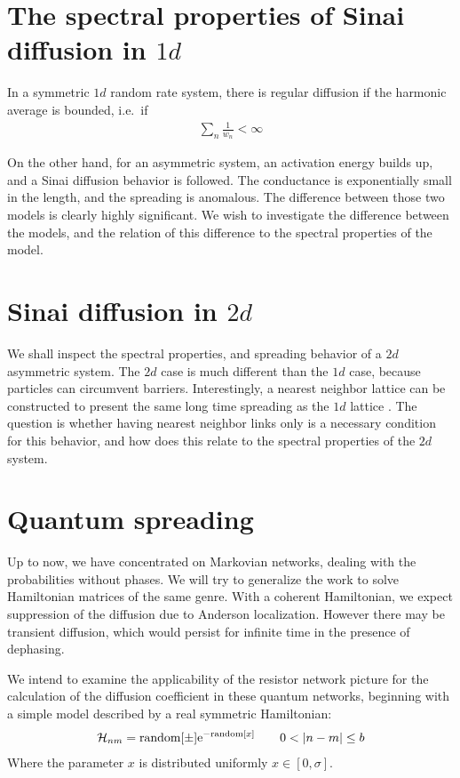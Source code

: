 \section{The spectral properties of Sinai diffusion in $1d$}

In a symmetric $1d$ random rate system, there is regular diffusion 
if the harmonic average is bounded, i.e.\ if
%
\begin{align}
 \sum_n \frac{1}{w_n} < \infty 
\end{align}
%

On the other hand, for an asymmetric system, an activation energy 
builds up, and a Sinai diffusion behavior is followed.
The conductance is exponentially small in the length, and the spreading 
is anomalous. The difference between those two models is clearly highly 
significant. We wish to investigate the difference between the models,
and the relation of this difference to the spectral properties of the model.

\section{Sinai diffusion in $2d$}

We shall inspect the spectral properties, and spreading behavior of a
$2d$ asymmetric system. The $2d$ case is much different than the $1d$ 
case, because particles can circumvent barriers. Interestingly,
a nearest neighbor lattice can be constructed to present the same 
long time spreading as the $1d$ lattice \cite{blumberg_selinger_diffusion_1989}.
The question is whether having nearest neighbor links only 
is a necessary condition for this behavior,
and how does this relate to the spectral properties of the $2d$ system.



\section{Quantum spreading}

Up to now, we have concentrated on Markovian networks, dealing with the probabilities without phases.
We will try to generalize the work to solve Hamiltonian matrices of the same genre.
With a coherent Hamiltonian, 
we expect suppression of the diffusion due to Anderson localization.
However there may be transient diffusion, which would persist 
for infinite time in the presence of dephasing.

We intend to examine the applicability of the resistor network picture for 
the calculation of the diffusion coefficient in these quantum networks, beginning with
a simple model described by a real symmetric Hamiltonian:
%
\begin{align}
  \mathcal{H}_{nm} = \textrm{random}[\pm] \eexp{-\textrm{random}[x]} \qquad 0<|n-m|\le b
\end{align}
%
Where the parameter $x$ is distributed uniformly $x\in [0,\sigma]$. 

